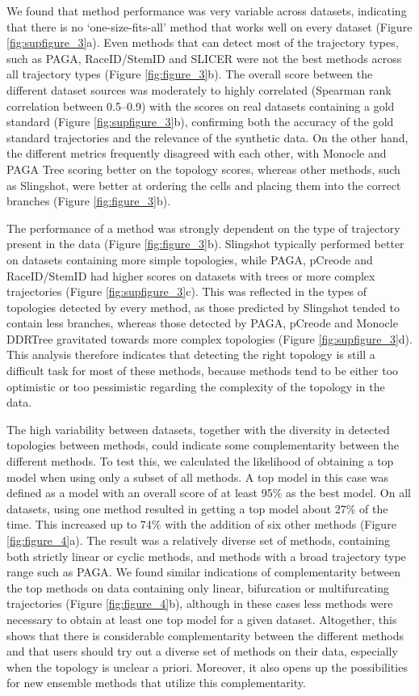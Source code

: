 We found that method performance was very variable across datasets, indicating that there is no ‘one-size-fits-all’ method that works well on every dataset (Figure \ref{fig:supfigure_3}a). Even methods that can detect most of the trajectory types, such as PAGA, RaceID/StemID and SLICER were not the best methods across all trajectory types (Figure \ref{fig:figure_3}b). The overall score between the different dataset sources was moderately to highly correlated (Spearman rank correlation between 0.5–0.9) with the scores on real datasets containing a gold standard (Figure \ref{fig:supfigure_3}b), confirming both the accuracy of the gold standard trajectories and the relevance of the synthetic data. On the other hand, the different metrics frequently disagreed with each other, with Monocle and PAGA Tree scoring better on the topology scores, whereas other methods, such as Slingshot, were better at ordering the cells and placing them into the correct branches (Figure \ref{fig:figure_3}b).


The performance of a method was strongly dependent on the type of trajectory present in the data (Figure \ref{fig:figure_3}b). Slingshot typically performed better on datasets containing more simple topologies, while PAGA, pCreode and RaceID/StemID had higher scores on datasets with trees or more complex trajectories (Figure \ref{fig:supfigure_3}c). This was reflected in the types of topologies detected by every method, as those predicted by Slingshot tended to contain less branches, whereas those detected by PAGA, pCreode and Monocle DDRTree gravitated towards more complex topologies (Figure \ref{fig:supfigure_3}d). This analysis therefore indicates that detecting the right topology is still a difficult task for most of these methods, because methods tend to be either too optimistic or too pessimistic regarding the complexity of the topology in the data.

The high variability between datasets, together with the diversity in detected topologies between methods, could indicate some complementarity between the different methods. To test this, we calculated the likelihood of obtaining a top model when using only a subset of all methods. A top model in this case was defined as a model with an overall score of at least 95$\%$ as the best model. On all datasets, using one method resulted in getting a top model about 27$\%$ of the time. This increased up to 74$\%$ with the addition of six other methods (Figure \ref{fig:figure_4}a). The result was a relatively diverse set of methods, containing both strictly linear or cyclic methods, and methods with a broad trajectory type range such as PAGA. We found similar indications of complementarity between the top methods on data containing only linear, bifurcation or multifurcating trajectories (Figure \ref{fig:figure_4}b), although in these cases less methods were necessary to obtain at least one top model for a given dataset. Altogether, this shows that there is considerable complementarity between the different methods and that users should try out a diverse set of methods on their data, especially when the topology is unclear a priori. Moreover, it also opens up the possibilities for new ensemble methods that utilize this complementarity.



